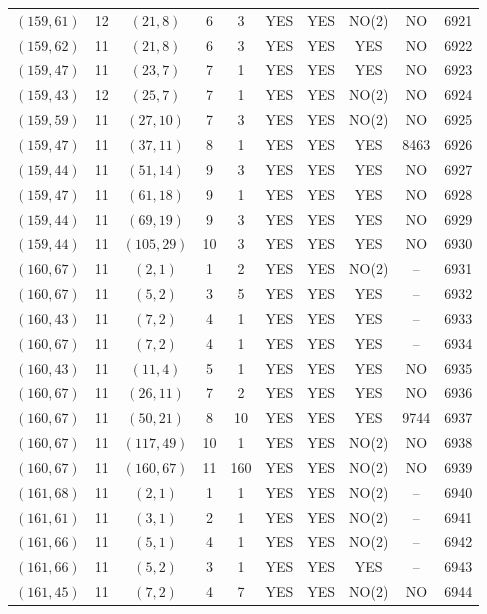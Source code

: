 \begin{longtable}{|c|c|c|c|c|c|c|c|c|c|}
$(159, 61)$ & 12 & $(21, 8)$ & 6 & 3 & YES & YES & NO(2) & NO & 6921\\
$(159, 62)$ & 11 & $(21, 8)$ & 6 & 3 & YES & YES & YES & NO & 6922\\
$(159, 47)$ & 11 & $(23, 7)$ & 7 & 1 & YES & YES & YES & NO & 6923\\
$(159, 43)$ & 12 & $(25, 7)$ & 7 & 1 & YES & YES & NO(2) & NO & 6924\\
$(159, 59)$ & 11 & $(27, 10)$ & 7 & 3 & YES & YES & NO(2) & NO & 6925\\
$(159, 47)$ & 11 & $(37, 11)$ & 8 & 1 & YES & YES & YES & 8463 & 6926\\
$(159, 44)$ & 11 & $(51, 14)$ & 9 & 3 & YES & YES & YES & NO & 6927\\
$(159, 47)$ & 11 & $(61, 18)$ & 9 & 1 & YES & YES & YES & NO & 6928\\
$(159, 44)$ & 11 & $(69, 19)$ & 9 & 3 & YES & YES & YES & NO & 6929\\
$(159, 44)$ & 11 & $(105, 29)$ & 10 & 3 & YES & YES & YES & NO & 6930\\
$(160, 67)$ & 11 & $(2, 1)$ & 1 & 2 & YES & YES & NO(2) & -- & 6931\\
$(160, 67)$ & 11 & $(5, 2)$ & 3 & 5 & YES & YES & YES & -- & 6932\\
$(160, 43)$ & 11 & $(7, 2)$ & 4 & 1 & YES & YES & YES & -- & 6933\\
$(160, 67)$ & 11 & $(7, 2)$ & 4 & 1 & YES & YES & YES & -- & 6934\\
$(160, 43)$ & 11 & $(11, 4)$ & 5 & 1 & YES & YES & YES & NO & 6935\\
$(160, 67)$ & 11 & $(26, 11)$ & 7 & 2 & YES & YES & YES & NO & 6936\\
$(160, 67)$ & 11 & $(50, 21)$ & 8 & 10 & YES & YES & YES & 9744 & 6937\\
$(160, 67)$ & 11 & $(117, 49)$ & 10 & 1 & YES & YES & NO(2) & NO & 6938\\
$(160, 67)$ & 11 & $(160, 67)$ & 11 & 160 & YES & YES & NO(2) & NO & 6939\\
$(161, 68)$ & 11 & $(2, 1)$ & 1 & 1 & YES & YES & NO(2) & -- & 6940\\
$(161, 61)$ & 11 & $(3, 1)$ & 2 & 1 & YES & YES & NO(2) & -- & 6941\\
$(161, 66)$ & 11 & $(5, 1)$ & 4 & 1 & YES & YES & NO(2) & -- & 6942\\
$(161, 66)$ & 11 & $(5, 2)$ & 3 & 1 & YES & YES & YES & -- & 6943\\
$(161, 45)$ & 11 & $(7, 2)$ & 4 & 7 & YES & YES & NO(2) & NO & 6944\\

\end{longtable}
